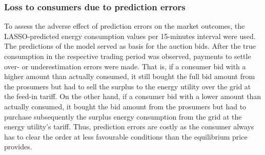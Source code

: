 \subsubsection{Loss to consumers due to prediction errors}

To assess the adverse effect of prediction errors on the market outcomes, the LASSO-predicted energy consumption values per 15-minutes interval were used. The predictions of the model served as basis for the auction bids. After the true consumption in the respective trading period was observed, payments to settle over- or underestimation errors were made. That is, if a consumer bid with a higher amount than actually consumed, it still bought the full bid amount from the prosumers but had to sell the surplus to the energy utility over the grid at the feed-in tariff. On the other hand, if a consumer bid with a lower amount than actually consumed, it bought the bid amount from the prosumers but had to purchase subsequently the surplus energy consumption from the grid at the energy utility's tariff. Thus, prediction errors are costly as the consumer always has to clear the order at less favourable conditions than the equilibrium price provides.


